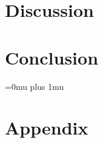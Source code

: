 %







\clearpage
\chapter{Discussion}\label{ch:discussion}



\clearpage
\chapter{Conclusion}\label{ch:conclusion}





%

\clearpage
\Urlmuskip=0mu plus 1mu\relax
\sloppy

{}


\chapter{Appendix}\label{ch:appendix}


